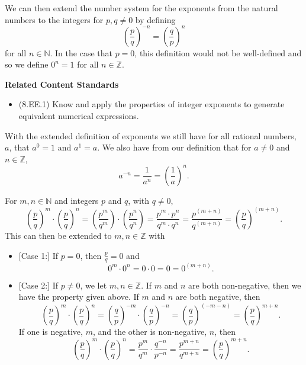 \documentclass[
]{book}
\providecommand{\tightlist}{%
  \setlength{\itemsep}{0pt}\setlength{\parskip}{0pt}}
\newenvironment{standards}{}{}
\theoremstyle{definition}
\theoremstyle{definition}
\theoremstyle{definition}
\theoremstyle{definition}
\theoremstyle{remark}
\begin{document}
We can then extend the number system for the exponents from the natural numbers to the integers for \(p,q\neq 0\) by defining
\[\left(\frac{p}{q}\right)^{-n} = \left(\frac{q}{p}\right)^n\] for all \(n\in \mathbb{N}\). In the case that \(p=0\), this definition would not be well-defined and so we define \(0^n=1\) for all \(n\in \mathbb{Z}\).

\begin{standards}

\begin{center}
\textbf{Related Content Standards}

\end{center}

\begin{itemize}
\tightlist
\item
  (8.EE.1) Know and apply the properties of integer exponents to generate equivalent numerical expressions.
\end{itemize}

\end{standards}

With the extended definition of exponents we still have for all rational numbers, \(a\), that \(a^0=1\) and \(a^1=a\). We also have from our definition that for \(a\neq 0\) and \(n\in \mathbb{Z}\), \[a^{-n}=\frac{1}{a^n}=\left(\frac{1}{a}\right)^n.\]

For \(m,n \in \mathbb{N}\) and integers \(p\) and \(q\), with \(q\neq 0\),
\[\left(\frac{p}{q}\right)^m \cdot \left(\frac{p}{q}\right)^n = \left(\frac{p^m}{q^m} \right) \cdot \left(\frac{p^n}{q^n}\right) = \frac{p^m \cdot p^n}{q^m \cdot q^n} = \frac{p^{(m+n)}}{q^{(m+n)}} = \left(\frac{p}{q}\right)^{(m+n)}.\]
This can then be extended to \(m,n\in \mathbb{Z}\) with

\begin{itemize}
\tightlist
\item
  {[}Case 1:{]} If \(p=0\), then \(\frac{p}{q}=0\) and \[0^m\cdot 0^n = 0\cdot 0=0=0^{(m+n)}.\]
\item
  {[}Case 2:{]} If \(p\neq 0\), we let \(m,n\in \mathbb{Z}\).
  If \(m\) and \(n\) are both non-negative, then we have the property given above.
  If \(m\) and \(n\) are both negative, then \[\left(\frac{p}{q}\right)^{m} \cdot \left(\frac{p}{q}\right)^{n} = 
  \left(\frac{q}{p}\right)^{-m} \cdot \left(\frac{q}{p}\right)^{-n} =
  \left(\frac{q}{p}\right)^{(-m-n)} = \left(\frac{p}{q}\right)^{m+n}.\]
  If one is negative, \(m\), and the other is non-negative, \(n\), then
  \[ \left(\frac{p}{q}\right)^{m} \cdot \left(\frac{p}{q}\right)^{n} = \frac{p^m}{q^m} \cdot \frac{q^{-n}}{p^{-n}} = \frac{p^{m+n}}{q^{m+n}} =  \left(\frac{p}{q}\right)^{m+n}. \]
\end{itemize}
\end{document}
